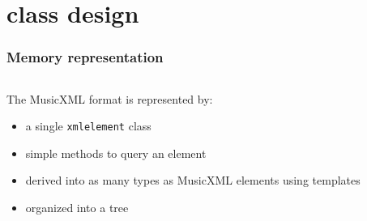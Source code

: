 \documentclass{beamer}
\begin{document}
\section{class   design}
\begin{frame}
	\frametitle{Memory representation}
	\begin{columns}
		\begin{column}[c]{7cm}
		The MusicXML format is represented by:
		{\small

\begin{itemize}
			  \item<1-> a single \texttt{xmlelement} class
			  \item<3-> simple methods to query an element
			  \item<5-> derived into as many types as MusicXML elements using templates
			  \item<7-> organized into a tree
			  \end{itemize}}
		\end{column}


\end{columns}
\end{frame}
\end{document}
